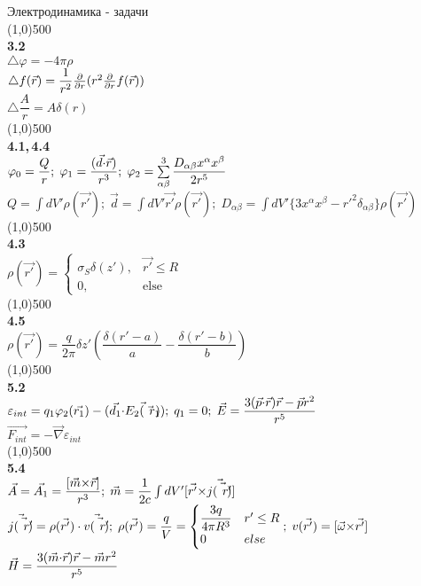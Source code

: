 

\newcommand{\num}[1]{\line(1,0){500}\\\textbf{#1}\\}


Электродинамика - задачи\\

\num{3.2}
$\triangle \varphi = -4\pi \rho$\\
$\triangle f(\vec{r}) = \dfrac1{r^2} \frac{\partial }{\partial r} (r^2 \frac{\partial }{\partial r}f(\vec{r})) $\\
$\triangle \dfrac{A}{r} = A \delta(r) $\\

\num{4.1,\,4.4}
$\varphi_0 = \dfrac{Q}{r};\; \varphi_1 = \dfrac{(\vec{d}{\cdot}\vec{r})}{r^3};\;\varphi_2 = \sum\limits_{\alpha\beta}^3 \dfrac{D_{\alpha\beta}x^\alpha x^\beta}{2r^5}$\\
$Q = \int dV' \rho(\vec{r'});\;\vec{d}=\int dV' \vec{r'}\rho(\vec{r'});\; D_{\alpha\beta} = \int dV' \{3x^\alpha x^\beta - r'^2 \delta_{\alpha\beta}\}\rho(\vec{r'})  $\\

\num{4.3}
$\rho(\vec{r'}) =
\begin{cases}
    \sigma_S\delta(z'), & \vec{r'} \le R \\
    0, & \text{else}
\end{cases}$\\

\num{4.5}
$\rho(\vec{r'}) = \dfrac{q}{2\pi}\delta{z'}\left(\dfrac{\delta(r'-a)}{a}-\dfrac{\delta(r'-b)}{b} \right)$\\

\num{5.2}
$\varepsilon_{int} = q_1 \varphi_2(\vec{r_1}) - (\vec{d_1}{\cdot}\vec{E_2(\vec{r_1})});\;q_1 = 0;\; \vec{E} = \dfrac{3(\vec{p}{\cdot}\vec{r})\vec{r}-\vec{p}r^2}{r^5}$\\
$\vec{F_{int}} = -\vec{\nabla}\varepsilon_{int}$\\

\num{5.4}
$\vec{A} = \vec{A_1} = \dfrac{[\vec{m}{\times}\vec{r}]}{r^3};\;\vec{m} = \dfrac1{2c}\int dV' [\vec{r'}{\times}\vec{j(\vec{r'})}] $\\
$ \vec{j(\vec{r'})} = \rho(\vec{r'}) \cdot \vec{v(\vec{r'})};\; \rho(\vec{r'}) = \dfrac{q}{V} = \begin{cases}\dfrac{3q}{4\pi R^3} & r'\le R \\ 0 & else \end{cases};\; v(\vec{r'}) = [\vec{\omega}{\times}\vec{r'}]$\\
$\vec{H} = \dfrac{3(\vec{m}{\cdot}\vec{r})\vec{r}-\vec{m}r^2}{r^5}$\\

